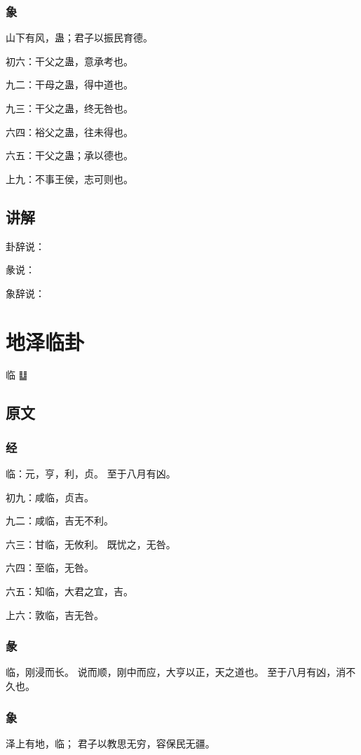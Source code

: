 \documentclass[12pt,oneside]{book}
\begin{document}
\subsection{象}
山下有风，蛊；君子以振民育德。

初六：干父之蛊，意承考也。

九二：干母之蛊，得中道也。

九三：干父之蛊，终无咎也。

六四：裕父之蛊，往未得也。

六五：干父之蛊；承以德也。

上九：不事王侯，志可则也。

\section{讲解}
卦辞说：

彖说：

象辞说：

\chapter{地泽临卦}
临 {\Large ䷒}

\section{原文}

\subsection{经}
临：元，亨，利，贞。 至于八月有凶。

初九：咸临，贞吉。

九二：咸临，吉无不利。

六三：甘临，无攸利。 既忧之，无咎。

六四：至临，无咎。

六五：知临，大君之宜，吉。

上六：敦临，吉无咎。

\subsection{彖}
临，刚浸而长。 说而顺，刚中而应，大亨以正，天之道也。 至于八月有凶，消不久也。

\subsection{象}
泽上有地，临； 君子以教思无穷，容保民无疆。
\end{document}
